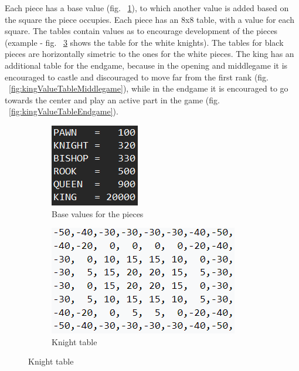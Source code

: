 Each piece has a base value (fig. ~\ref{fig:piecesValues}), to which another value is added based on the square the piece occupies. Each piece has an 8x8 table, with a value for each square. The tables contain values as to encourage development of the pieces (example - fig. ~\ref{fig:knightValueTable} shows the table for the white knights). The tables for black pieces are horizontally simetric to the ones for the white pieces. The king has an additional table for the endgame, because in the opening and middlegame it is encouraged to castle and discouraged to move far from the first rank (fig. ~\ref{fig:kingValueTableMiddlegame}), while in the endgame it is encouraged to go towards the center and play an active part in the game (fig. ~\ref{fig:kingValueTableEndgame}).\cite{wikiEval}

\begin{figure}[t]
    \centering
    \caption{}
    \begin{subfigure}{0.49\textwidth}
        \centering
        \includegraphics{figures/pieces_values.png}
        \caption{Base values for the pieces}
        \label{fig:piecesValues}
    \end{subfigure}
    \begin{subfigure}{0.49\textwidth}
        \centering
        \includegraphics{figures/knight_value_table.png}
        \caption{Knight table}
        \label{fig:knightValueTable}
    \end{subfigure}
\end{figure}

